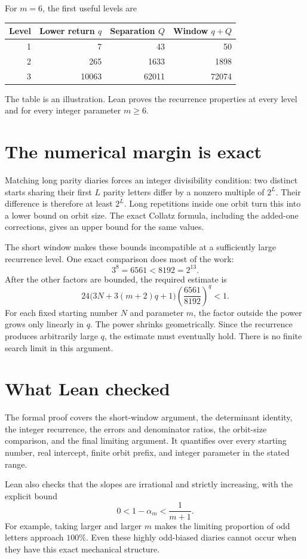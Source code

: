 \documentclass[11pt]{article}
\begin{document}
For $m=6$, the first useful levels are
\begin{center}
\begin{tabular}{rrrr}
\toprule
Level&Lower return $q$&Separation $Q$&Window $q+Q$\\
\midrule
1&7&43&50\\
2&265&1633&1898\\
3&10063&62011&72074\\
\bottomrule
\end{tabular}
\end{center}
The table is an illustration. Lean proves the recurrence properties at
every level and for every integer parameter $m\ge6$.

\section{The numerical margin is exact}
Matching long parity diaries forces an integer divisibility condition:
two distinct starts sharing their first $L$ parity letters differ by a
nonzero multiple of $2^L$. Their difference is therefore at least $2^L$.
Long repetitions inside one orbit turn this into a lower bound on orbit
size. The exact Collatz formula, including the added-one corrections,
gives an upper bound for the same values.

The short window makes these bounds incompatible at a sufficiently
large recurrence level. One exact comparison does most of the work:
\[
3^8=6561<8192=2^{13}.
\]
After the other factors are bounded, the required estimate is
\[
24\bigl(3N+3(m+2)q+1\bigr)
\left(\frac{6561}{8192}\right)^q<1.
\]
For each fixed starting number $N$ and parameter $m$, the factor outside
the power grows only linearly in $q$. The power shrinks geometrically.
Since the recurrence produces arbitrarily large $q$, the estimate must
eventually hold. There is no finite search limit in this argument.

\newpage
\section{What Lean checked}
The formal proof covers the short-window argument, the determinant
identity, the integer recurrence, the errors and denominator ratios,
the orbit-size comparison, and the final limiting argument. It quantifies
over every starting number, real intercept, finite orbit prefix, and
integer parameter in the stated range.

Lean also checks that the slopes are irrational and strictly increasing,
with the explicit bound
\[
0<1-\alpha_m<\frac1{m+1}.
\]
For example, taking larger and larger $m$ makes the limiting proportion
of odd letters approach $100\%$. Even these highly odd-biased diaries
cannot occur when they have this exact mechanical structure.
\end{document}
